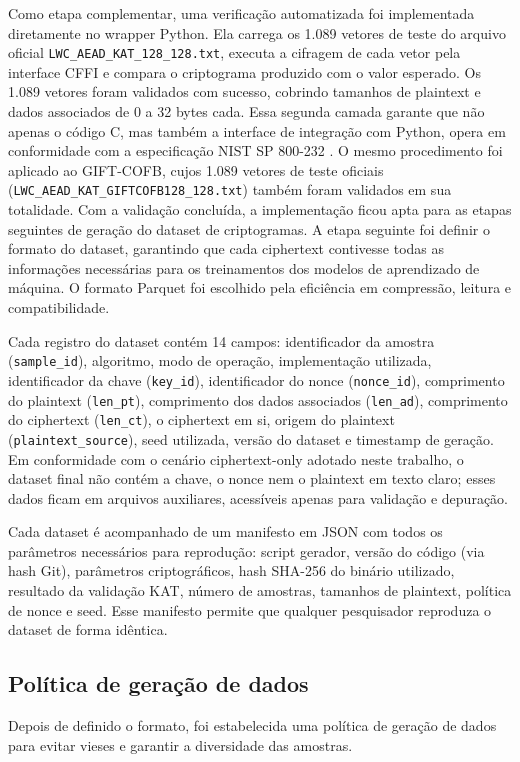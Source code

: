 Como etapa complementar, uma verificação automatizada foi implementada diretamente no wrapper Python. Ela carrega os 1.089 vetores de teste do arquivo oficial \texttt{LWC\_AEAD\_KAT\_128\_128.txt}, executa a cifragem de cada vetor pela interface CFFI e compara o criptograma produzido com o valor esperado. Os 1.089 vetores foram validados com sucesso, cobrindo tamanhos de plaintext e dados associados de 0 a 32 bytes cada. Essa segunda camada garante que não apenas o código C, mas também a interface de integração com Python, opera em conformidade com a especificação NIST SP 800-232 \cite{nist_sp800232_2025}.
O mesmo procedimento foi aplicado ao GIFT-COFB, cujos 1.089 vetores de teste oficiais (\texttt{LWC\_AEAD\_KAT\_GIFTCOFB128\_128.txt}) também foram validados em sua totalidade.
Com a validação concluída, a implementação ficou apta para as etapas seguintes de geração do dataset de criptogramas.
A etapa seguinte foi definir o formato do dataset, garantindo que cada ciphertext contivesse todas as informações necessárias para os treinamentos dos modelos de aprendizado de máquina. O formato Parquet foi escolhido pela eficiência em compressão, leitura e compatibilidade.

Cada registro do dataset contém 14 campos: identificador da amostra (\texttt{sample\_id}), algoritmo, modo de operação, implementação utilizada, identificador da chave (\texttt{key\_id}), identificador do nonce (\texttt{nonce\_id}), comprimento do plaintext (\texttt{len\_pt}), comprimento dos dados associados (\texttt{len\_ad}), comprimento do ciphertext (\texttt{len\_ct}), o ciphertext em si, origem do plaintext (\texttt{plaintext\_source}), seed utilizada, versão do dataset e timestamp de geração. Em conformidade com o cenário ciphertext-only adotado neste trabalho, o dataset final não contém a chave, o nonce nem o plaintext em texto claro; esses dados ficam em arquivos auxiliares, acessíveis apenas para validação e depuração.

Cada dataset é acompanhado de um manifesto em JSON com todos os parâmetros necessários para reprodução: script gerador, versão do código (via hash Git), parâmetros criptográficos, hash SHA-256 do binário utilizado, resultado da validação KAT, número de amostras, tamanhos de plaintext, política de nonce e seed. Esse manifesto permite que qualquer pesquisador reproduza o dataset de forma idêntica.

\subsection{Política de geração de dados}
\label{sec:particionamento}
Depois de definido o formato, foi estabelecida uma política de geração de dados para evitar vieses e garantir a diversidade das amostras.


